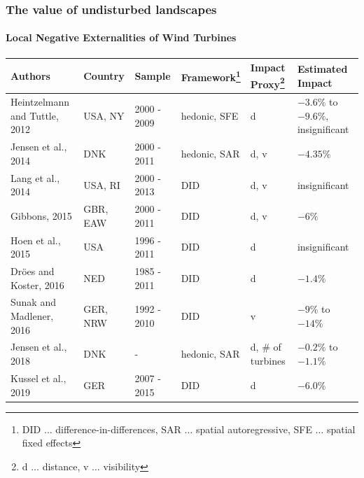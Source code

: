 \documentclass[aspectratio=169, xcolor=dvipsnames]{beamer}
\begin{document}
\begin{frame}
\frametitle{The value of undisturbed landscapes}
\framesubtitle{Local Negative Externalities of Wind Turbines}
\begin{table}
\centering
\begin{scriptsize}
	\begin{tabular}{p{3.2cm} l l l p{1.1cm} p{2.4cm}}
	\hline
	Authors & Country & Sample & Framework\footnote[frame]{DID $\ldots$ difference-in-differences, SAR $\ldots$ spatial autoregressive, SFE $\ldots$ spatial fixed effects} & Impact Proxy\footnote[frame]{d $\ldots$ distance, v $\ldots$ visibility} & Estimated Impact \\
	\hline \hline
	Heintzelmann and Tuttle, 2012 & USA, NY & 2000 - 2009 & hedonic, SFE & d & $-3.6\%$ to $-9.6\%$, insignificant \\ \hline
	Jensen et al., 2014 & DNK & 2000 - 2011 & hedonic, SAR & d, v & $-4.35\%$ \\ \hline
	Lang et al., 2014 & USA, RI & 2000 - 2013 & DID & d, v & insignificant  \\ \hline
	Gibbons, 2015 & GBR, EAW & 2000 - 2011 & DID & d, v & $-6\%$ \\ \hline
	Hoen et al., 2015 & USA & 1996 - 2011 & DID & d & insignificant \\ \hline
	Dröes and Koster, 2016 & NED & 1985 - 2011 & DID & d & $-1.4\%$\\ \hline
	Sunak and Madlener, 2016 & GER, NRW & 1992 - 2010 & DID & v & $-9\%$ to $-14\%$ \\ \hline
	Jensen et al., 2018 & DNK & - & hedonic, SAR & d, \# of turbines & $-0.2\%$ to $-1.1\%$ \\ \hline
	Kussel et al., 2019 & GER & 2007 - 2015 & DID & d & $-6.0\%$ \\ \hline \hline
	\end{tabular}
\end{scriptsize}
\end{table}
\end{frame}
\end{document}

